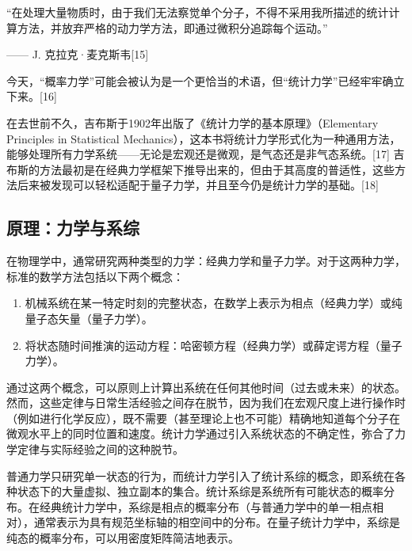 “在处理大量物质时，由于我们无法察觉单个分子，不得不采用我所描述的统计计算方法，并放弃严格的动力学方法，即通过微积分追踪每个运动。”

—— J. 克拉克·麦克斯韦[15]  

今天，“概率力学”可能会被认为是一个更恰当的术语，但“统计力学”已经牢牢确立下来。[16] 

在去世前不久，吉布斯于1902年出版了《统计力学的基本原理》（Elementary Principles in Statistical Mechanics），这本书将统计力学形式化为一种通用方法，能够处理所有力学系统——无论是宏观还是微观，是气态还是非气态系统。[17] 吉布斯的方法最初是在经典力学框架下推导出来的，但由于其高度的普适性，这些方法后来被发现可以轻松适配于量子力学，并且至今仍是统计力学的基础。[18]
\subsection{原理：力学与系综} 
在物理学中，通常研究两种类型的力学：经典力学和量子力学。对于这两种力学，标准的数学方法包括以下两个概念：
\begin{enumerate}
\item 机械系统在某一特定时刻的完整状态，在数学上表示为相点（经典力学）或纯量子态矢量（量子力学）。  
\item 将状态随时间推演的运动方程：哈密顿方程（经典力学）或薛定谔方程（量子力学）。
\end{enumerate}
通过这两个概念，可以原则上计算出系统在任何其他时间（过去或未来）的状态。然而，这些定律与日常生活经验之间存在脱节，因为我们在宏观尺度上进行操作时（例如进行化学反应），既不需要（甚至理论上也不可能）精确地知道每个分子在微观水平上的同时位置和速度。统计力学通过引入系统状态的不确定性，弥合了力学定律与实际经验之间的这种脱节。

普通力学只研究单一状态的行为，而统计力学引入了统计系综的概念，即系统在各种状态下的大量虚拟、独立副本的集合。统计系综是系统所有可能状态的概率分布。在经典统计力学中，系综是相点的概率分布（与普通力学中的单一相点相对），通常表示为具有规范坐标轴的相空间中的分布。在量子统计力学中，系综是纯态的概率分布，可以用密度矩阵简洁地表示。